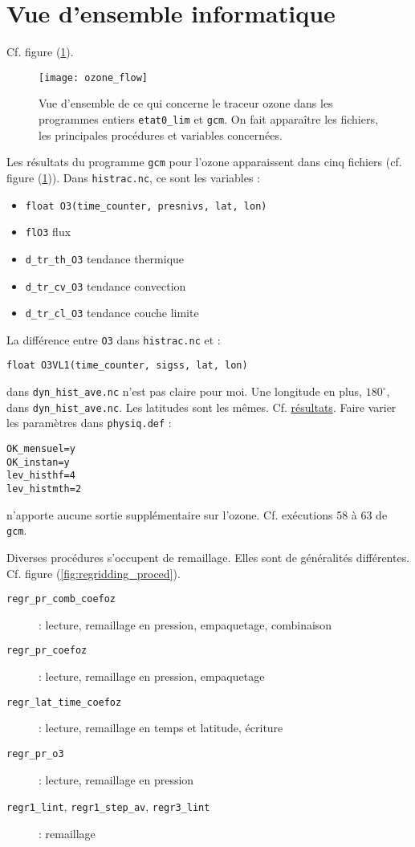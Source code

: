 \documentclass[a4paper,english,french]{article}
\begin{document}
\section{Vue d'ensemble informatique}

Cf. figure (\ref{fig:ozone_flow}).
\begin{figure}[htbp]
  \centering
  \texttt{[image: ozone\_flow]}
  \caption[Vue d'ensemble de ce qui concerne le traceur ozone]{Vue
    d'ensemble de ce qui concerne le traceur ozone dans les programmes
    entiers \texttt{etat0\_lim} et \texttt{gcm}. On fait apparaître
    les fichiers, les principales procédures et variables concernées.}
  \label{fig:ozone_flow}
\end{figure}
Les résultats du programme \verb+gcm+ pour l'ozone apparaissent dans
cinq fichiers (cf. figure (\ref{fig:ozone_flow})). Dans \verb+histrac.nc+,
ce sont les variables :
\begin{itemize}
\item \verb+float O3(time_counter, presnivs, lat, lon)+
\item \verb+flO3+ flux
\item \verb+d_tr_th_O3+ tendance thermique
\item \verb+d_tr_cv_O3+ tendance convection
\item \verb+d_tr_cl_O3+ tendance couche limite
\end{itemize}
La différence entre \verb+O3+ dans \verb+histrac.nc+ et :
\begin{verbatim}
float O3VL1(time_counter, sigss, lat, lon)
\end{verbatim}
dans \verb+dyn_hist_ave.nc+ n'est pas claire pour moi. Une longitude
en plus, $180^\circ$, dans \verb+dyn_hist_ave.nc+. Les latitudes sont
les mêmes. Cf.
\hyperref{file:/user/guez/Documents/Utilisation_LMDZ/Utilisation_LMDZ.texfol/Utilisation-LMDZ.dvi}{section}{ozone}{résultats}.
Faire varier les paramètres dans \verb+physiq.def+ :
\begin{verbatim}
OK_mensuel=y
OK_instan=y
lev_histhf=4
lev_histmth=2
\end{verbatim}
n'apporte aucune sortie supplémentaire sur l'ozone. Cf. exécutions 58
à 63 de \verb+gcm+.

Diverses procédures s'occupent de remaillage. Elles sont de
généralités différentes. Cf. figure (\ref{fig:regridding_proced}).
\begin{description}
\item[\texttt{regr\_pr\_comb\_coefoz}] : lecture, remaillage en pression,
  empaquetage, combinaison
\item[\texttt{regr\_pr\_coefoz}] : lecture, remaillage en pression, empaquetage
\item[\texttt{regr\_lat\_time\_coefoz}] : lecture, remaillage en temps et
  latitude, écriture
\item[\texttt{regr\_pr\_o3}] : lecture, remaillage en pression
\item[\texttt{regr1\_lint}, \texttt{regr1\_step\_av},
  \texttt{regr3\_lint}] : remaillage
\end{description}
\end{document}
